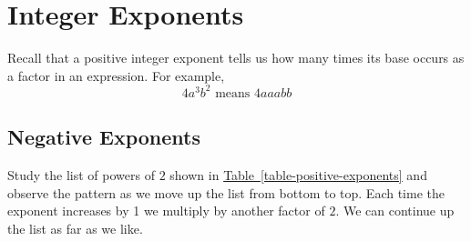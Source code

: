 \documentclass[10pt,]{book}
\theoremstyle{plain}
\theoremstyle{definition}
\theoremstyle{definition}
\theoremstyle{definition}
\theoremstyle{definition}
\theoremstyle{definition}
\numberwithin{equation}{section}
\begin{document}
\section[Integer Exponents]{Integer Exponents}\label{Integer-Exponents}

    Recall that a positive integer exponent tells us how many times its base occurs as a factor in an expression. For example,
    \begin{equation*}4a^3b^2 \text{ means } 4aaabb\end{equation*}
%
\typeout{************************************************}
\typeout{************************************************}
\subsection[Negative Exponents]{Negative Exponents}\label{subsection-63}
\index{}
    Study the list of powers of \(2\) shown in \hyperref[table-positive-exponents]{Table~\ref{table-positive-exponents}} and observe the pattern as we move up the list from bottom to top. Each time the exponent increases by 1 we multiply by another factor of \(2\). We can continue up the list as far as we like.
%
\par
\end{document}
